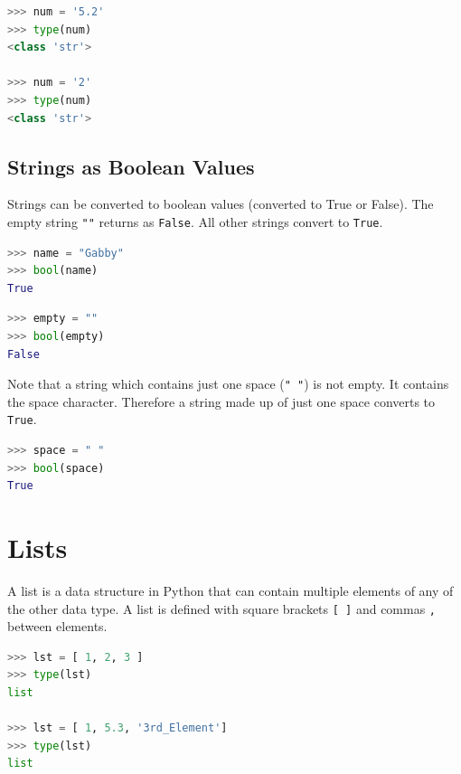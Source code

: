 \documentclass{book}
\begin{document}
\begin{lstlisting}[language=Python]
>>> num = '5.2'
>>> type(num)
<class 'str'>

>>> num = '2'
>>> type(num)
<class 'str'>
\end{lstlisting}
    




    
        \subsection{Strings as Boolean Values}\label{strings-as-boolean-values}

Strings can be converted to boolean values (converted to True or False).
The empty string \lstinline!""! returns as \lstinline!False!. All other
strings convert to \lstinline!True!.

\begin{lstlisting}[language=Python]
>>> name = "Gabby"
>>> bool(name)
True
\end{lstlisting}

\begin{lstlisting}[language=Python]
>>> empty = ""
>>> bool(empty)
False
\end{lstlisting}

Note that a string which contains just one space (\lstinline!" "!) is
not empty. It contains the space character. Therefore a string made up
of just one space converts to \lstinline!True!.

\begin{lstlisting}[language=Python]
>>> space = " "
>>> bool(space)
True
\end{lstlisting}
    




    
        \section{Lists}\label{lists}
    




    
        A list is a data structure in Python that can contain multiple elements
of any of the other data type. A list is defined with square brackets
\lstinline![ ]! and commas \lstinline!,! between elements.

\begin{lstlisting}[language=Python]
>>> lst = [ 1, 2, 3 ]
>>> type(lst)
list

>>> lst = [ 1, 5.3, '3rd_Element']
>>> type(lst)
list
\end{lstlisting}
    
\end{document}
